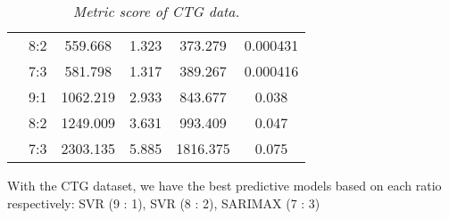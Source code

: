 \documentclass{ieeeojies}
\begin{document}
\begin{table}[H]
\begin{tabular}{|c|c|c|c|c|c|}
\rowcolor[HTML]{FFB6AF} 
\cellcolor[HTML]{FFB6AF}{\color[HTML]{000000} }                                                                                         & {\color[HTML]{000000} 8:2}            & {\color[HTML]{000000} 559.668}       & {\color[HTML]{000000} 1.323}         & {\color[HTML]{000000} 373.279}      & {\color[HTML]{000000} 0.000431}      \\ \cline{2-6} 
\rowcolor[HTML]{FFB6AF} 
\multirow{-3}{*}{\cellcolor[HTML]{FFB6AF}{\color[HTML]{000000} \textbf{SARIMAX}}}                                                       & {\color[HTML]{FE0000} 7:3}            & {\color[HTML]{FE0000} 581.798}       & {\color[HTML]{FE0000} 1.317}         & {\color[HTML]{FE0000} 389.267}      & {\color[HTML]{FE0000} 0.000416}      \\ \hline
\rowcolor[HTML]{FBC193} 
\cellcolor[HTML]{FBC193}{\color[HTML]{000000} }                                                                                         & {\color[HTML]{000000} 9:1}            & {\color[HTML]{000000} 1062.219}      & {\color[HTML]{000000} 2.933}         & {\color[HTML]{000000} 843.677}      & {\color[HTML]{000000} 0.038}         \\ \cline{2-6} 
\rowcolor[HTML]{FBC193} 
\cellcolor[HTML]{FBC193}{\color[HTML]{000000} }                                                                                         & {\color[HTML]{000000} 8:2}            & {\color[HTML]{000000} 1249.009}      & {\color[HTML]{000000} 3.631}         & {\color[HTML]{000000} 993.409}      & {\color[HTML]{000000} 0.047}         \\ \cline{2-6} 
\rowcolor[HTML]{FBC193} 
\multirow{-3}{*}{\cellcolor[HTML]{FBC193}{\color[HTML]{000000} \textbf{FCN}}}                                                           & {\color[HTML]{000000} 7:3}            & {\color[HTML]{000000} 2303.135}      & {\color[HTML]{000000} 5.885}         & {\color[HTML]{000000} 1816.375}     & {\color[HTML]{000000} 0.075}         \\ \hline
\end{tabular}
\caption{\centering \textit{Metric score of CTG data.}}
\end{table}
With the CTG dataset, we have the best predictive models based on each ratio respectively: SVR (9 : 1), SVR (8 : 2), SARIMAX (7 : 3)
\end{document}
